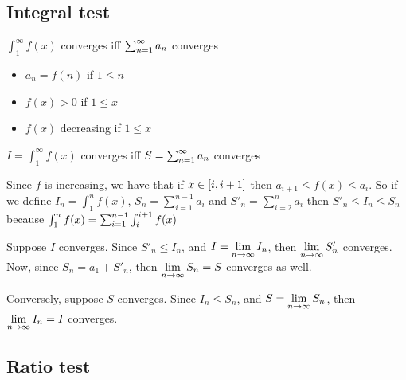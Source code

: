 \subsection{Integral test}


\begin{property}{ $\int_{1}^{\infty} f(x)$ converges iff  $\sum_{n=1}^{\infty} a_n$ converges }
    \begin{precondition}
        \begin{itemize}
            \item $a_n=f(n)$ if $1 \leq n$
            \item $f(x)>0$ if $1 \leq x$
            \item $f(x)$ decreasing if $1 \leq x$
        \end{itemize}
    \end{precondition}
    \begin{claim}
        $I=\int_{1}^{\infty} f(x)$ converges iff  $S=\sum_{n=1}^{\infty} a_n$ converges
    \end{claim}
    \begin{Proof}

        Since $f$ is increasing, we have that if $x \in \left[ i,i+1 \right]$ then $a_{i+1}≤f(x)≤a_i$.
        So if we define $I_n=\int_1^n f(x)$, $S_n=\sum_{i=1}^{n-1} a_i$ and $S'_n=\sum_{i=2}^{n} a_i$ then  $S'_n ≤ I_n ≤  S_n$
        because $\int_1^n f(x) = \sum_{i=1}^{n-1} \int_i^{i+1} f(x)$

        Suppose $I$ converges. Since $S'_n ≤ I_n$, and $I=\lim\limits_{n \rightarrow \infty} I_n$, then $\lim\limits_{n \rightarrow \infty} S'_n$ converges. Now, since $S_n= a_1 + S'_n$, then $\lim\limits_{n \rightarrow \infty} S_n=S$ converges as well.

        Conversely, suppose $S$ converges. Since $I_n ≤ S_n$, and $S=\lim\limits_{n \rightarrow \infty} S_n$, then $\lim\limits_{n \rightarrow \infty} I_n=I$ converges.

    \end{Proof}
\end{property}



\subsection{Ratio test}

